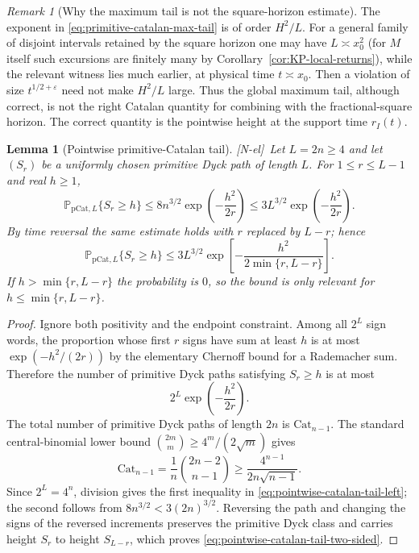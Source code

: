 \documentclass[11pt]{amsart}
\numberwithin{equation}{section}
\theoremstyle{plain}
\newtheorem{lemma}[theorem]{Lemma}
\theoremstyle{definition}
\theoremstyle{remark}
\newtheorem{remark}[theorem]{Remark}
\newcommand{\eps}{\varepsilon}
\newcommand{\tagNE}{\textup{[N-el]}}
\begin{document}
\begin{remark}[Why the maximum tail is not the square-horizon estimate]
\label{rem:max-tail-square-limit}
The exponent in \eqref{eq:primitive-catalan-max-tail} is of order
$H^2/L$.  For a general family of disjoint intervals retained by the
square horizon one may have $L\asymp x_0^2$ (for $M$ itself such excursions
are finitely many by Corollary~\ref{cor:KP-local-returns}), while the relevant witness lies much earlier, at physical
time $t\asymp x_0$.  Then a violation of size $t^{1/2+\eps}$ need not make
$H^2/L$ large.  Thus the global maximum tail, although correct, is not the
right Catalan quantity for combining with the fractional-square horizon.
The correct quantity is the pointwise height at the support time
$r_I(t)$.
\end{remark}

\begin{lemma}[Pointwise primitive-Catalan tail]
\label{lem:pointwise-catalan-tail}
\tagNE\ Let $L=2n\ge4$ and let $(S_r)$ be a uniformly chosen primitive Dyck path of
length $L$.  For $1\le r\le L-1$ and real $h\ge1$,
\begin{equation}
\label{eq:pointwise-catalan-tail-left}
 \mathbb P_{\mathrm{pCat},L}\{S_r\ge h\}
 \le 8n^{3/2}\exp\!\left(-\frac{h^2}{2r}\right)
 \le 3L^{3/2}\exp\!\left(-\frac{h^2}{2r}\right).
\end{equation}
By time reversal the same estimate holds with $r$ replaced by $L-r$;
hence
\begin{equation}
\label{eq:pointwise-catalan-tail-two-sided}
 \mathbb P_{\mathrm{pCat},L}\{S_r\ge h\}
 \le 3L^{3/2}
 \exp\!\left[-\frac{h^2}{2\min\{r,L-r\}}\right].
\end{equation}
If $h>\min\{r,L-r\}$ the probability is $0$, so the bound is only
relevant for $h\le\min\{r,L-r\}$.
\end{lemma}

\begin{proof}
Ignore both positivity and the endpoint constraint.  Among all $2^L$ sign
words, the proportion whose first $r$ signs have sum at least $h$ is at most
$\exp(-h^2/(2r))$ by the elementary Chernoff bound for a Rademacher sum.
Therefore the number of primitive Dyck paths satisfying $S_r\ge h$ is at
most
\[
 2^L\exp\!\left(-\frac{h^2}{2r}\right).
\]
The total number of primitive Dyck paths of length $2n$ is $\mathrm{Cat}_{n-1}$.  The
standard central-binomial lower bound
$\binom{2m}{m}\ge4^m/(2\sqrt m)$ gives
\[
 \mathrm{Cat}_{n-1}=\frac1n\binom{2n-2}{n-1}
 \ge\frac{4^{n-1}}{2n\sqrt{n-1}}.
\]
Since $2^L=4^n$, division gives the first inequality in
\eqref{eq:pointwise-catalan-tail-left}; the second follows from
$8n^{3/2}<3(2n)^{3/2}$.  Reversing the path and changing the signs of the
reversed increments preserves the primitive Dyck class and carries height
$S_r$ to height $S_{L-r}$, which proves
\eqref{eq:pointwise-catalan-tail-two-sided}.
\end{proof}
\end{document}

